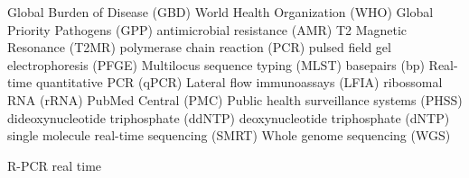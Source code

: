 Global Burden of Disease (GBD)
World Health Organization (WHO)
Global Priority Pathogens (GPP)
antimicrobial resistance (AMR)
T2 Magnetic Resonance (T2MR)
polymerase chain reaction (PCR)
pulsed field gel electrophoresis (PFGE)
Multilocus sequence typing (MLST)
basepairs (bp)
Real-time quantitative PCR (qPCR)
Lateral flow immunoassays (LFIA)
ribossomal RNA (rRNA)
PubMed Central\textsuperscript{\small\textregistered} (PMC)
Public health surveillance systems (PHSS)
dideoxynucleotide triphosphate (ddNTP) 
deoxynucleotide triphosphate (dNTP)
single molecule real-time sequencing (SMRT)
Whole genome sequencing (WGS)

R-PCR real time 